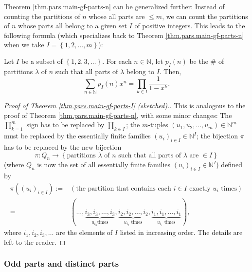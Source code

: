 Theorem \ref{thm.pars.main-gf-parts-n} can be generalized further: Instead of
counting the partitions of $n$ whose all parts are $\leq m$, we can count the
partitions of $n$ whose parts all belong to a given set $I$ of positive
integers. This leads to the following formula (which specializes back to
Theorem \ref{thm.pars.main-gf-parts-n} when we take $I=\left\{  1,2,\ldots
,m\right\}  $):

\begin{theorem}
\label{thm.pars.main-gf-parts-I}Let $I$ be a subset of $\left\{
1,2,3,\ldots\right\}  $. For each $n\in\mathbb{N}$, let $p_{I}\left(
n\right)  $ be the \# of partitions $\lambda$ of $n$ such that all parts of
$\lambda$ belong to $I$. Then,
\[
\sum_{n\in\mathbb{N}}p_{I}\left(  n\right)  x^{n}=\prod_{k\in I}\dfrac
{1}{1-x^{k}}.
\]

\end{theorem}

\begin{proof}
[Proof of Theorem \ref{thm.pars.main-gf-parts-I} (sketched).]This is analogous
to the proof of Theorem \ref{thm.pars.main-gf-parts-n}, with some minor
changes: The $\prod_{k=1}^{m}$ sign has to be replaced by $\prod_{k\in I}$;
the $m$-tuples $\left(  u_{1},u_{2},\ldots,u_{m}\right)  \in\mathbb{N}^{m}$
must be replaced by the essentially finite families $\left(  u_{i}\right)
_{i\in I}\in\mathbb{N}^{I}$; the bijection $\pi$ has to be replaced by the new
bijection
\[
\pi:Q_{n}\rightarrow\left\{  \text{partitions }\lambda\text{ of }n\text{ such
that all parts of }\lambda\text{ are }\in I\right\}
\]
(where $Q_{n}$ is now the set of all essentially finite families $\left(
u_{i}\right)  _{i\in I}\in\mathbb{N}^{I}$) defined by%
\begin{align*}
\pi\left(  \left(  u_{i}\right)  _{i\in I}\right)  :=  &  \left(  \text{the
partition that contains each }i\in I\text{ exactly }u_{i}\text{ times}\right)
\\
=  &  \left(  \ldots,\underbrace{i_{3},i_{3},\ldots,i_{3}}_{u_{i_{3}}\text{
times}},\underbrace{i_{2},i_{2},\ldots,i_{2}}_{u_{i_{2}}\text{ times}%
},\underbrace{i_{1},i_{1},\ldots,i_{1}}_{u_{i_{1}}\text{ times}}\right)  ,
\end{align*}
where $i_{1},i_{2},i_{3},\ldots$ are the elements of $I$ listed in increasing
order. The details are left to the reader.
\end{proof}

\subsubsection{Odd parts and distinct parts}

